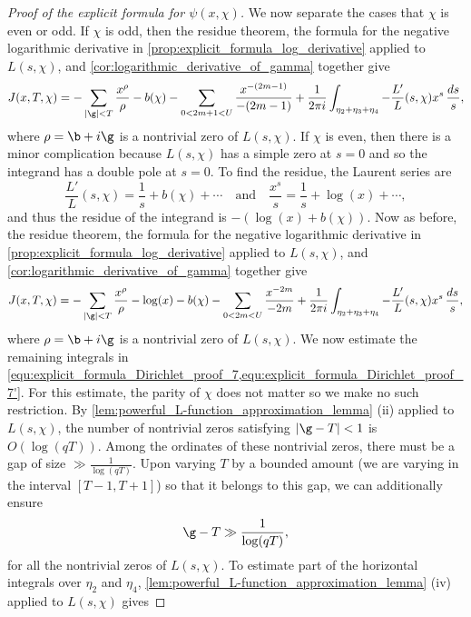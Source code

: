 \begin{proof}[Proof of the explicit formula for $\psi(x,\chi)$]
      We now separate the cases that $\chi$ is even or odd. If $\chi$ is odd, then the residue theorem, the formula for the negative logarithmic derivative in \cref{prop:explicit_formula_log_derivative} applied to $L(s,\chi)$, and \cref{cor:logarithmic_derivative_of_gamma} together give
      \begin{equation}\label{equ:explicit_formula_Dirichlet_proof_7}
        J(x,T,\chi) = -\sum_{|\g| < T}\frac{x^{\rho}}{\rho}-b(\chi)-\sum_{0 < 2m+1 < U}\frac{x^{-(2m-1)}}{-(2m-1)}+\frac{1}{2\pi i}\int_{\eta_{2}+\eta_{3}+\eta_{4}}-\frac{L'}{L}(s,\chi)x^{s}\,\frac{ds}{s},
      \end{equation}
      where $\rho = \b+i\g$ is a nontrivial zero of $L(s,\chi)$. If $\chi$ is even, then there is a minor complication because $L(s,\chi)$ has a simple zero at $s = 0$ and so the integrand has a double pole at $s = 0$. To find the residue, the Laurent series are
      \[
        \frac{L'}{L}(s,\chi) = \frac{1}{s}+b(\chi)+\cdots \quad \text{and} \quad \frac{x^{s}}{s} = \frac{1}{s}+\log(x)+\cdots,
      \]
      and thus the residue of the integrand is $-(\log(x)+b(\chi))$. Now as before, the residue theorem, the formula for the negative logarithmic derivative in \cref{prop:explicit_formula_log_derivative} applied to $L(s,\chi)$, and \cref{cor:logarithmic_derivative_of_gamma} together give
      \begin{equation}\label{equ:explicit_formula_Dirichlet_proof_7'}
        J(x,T,\chi) = -\sum_{|\g| < T}\frac{x^{\rho}}{\rho}-\log(x)-b(\chi)-\sum_{0 < 2m < U}\frac{x^{-2m}}{-2m}+\frac{1}{2\pi i}\int_{\eta_{2}+\eta_{3}+\eta_{4}}-\frac{L'}{L}(s,\chi)x^{s}\,\frac{ds}{s},
      \end{equation}
      where $\rho = \b+i\g$ is a nontrivial zero of $L(s,\chi)$. We now estimate the remaining integrals in \cref{equ:explicit_formula_Dirichlet_proof_7,equ:explicit_formula_Dirichlet_proof_7'}. For this estimate, the parity of $\chi$ does not matter so we make no such restriction. By \cref{lem:powerful_L-function_approximation_lemma} (ii) applied to $L(s,\chi)$, the number of nontrivial zeros satisfying $|\g-T| < 1$ is $O(\log(qT))$. Among the ordinates of these nontrivial zeros, there must be a gap of size $\gg \frac{1}{\log(qT)}$. Upon varying $T$ by a bounded amount (we are varying in the interval $[T-1,T+1]$) so that it belongs to this gap, we can additionally ensure
      \[
        \g-T \gg \frac{1}{\log(qT)},
      \]
      for all the nontrivial zeros of $L(s,\chi)$. To estimate part of the horizontal integrals over $\eta_{2}$ and $\eta_{4}$, \cref{lem:powerful_L-function_approximation_lemma} (iv) applied to $L(s,\chi)$ gives

\end{proof}
